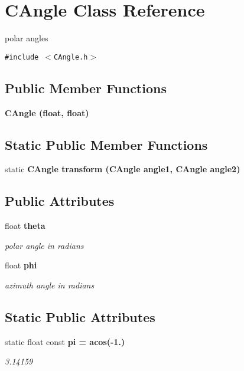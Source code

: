 \section{CAngle Class Reference}
\label{classCAngle}
polar angles  


{\tt \#include $<$CAngle.h$>$}

\subsection*{Public Member Functions}
\begin{CompactItemize}
\item 
\bf{CAngle} (float, float)
\end{CompactItemize}
\subsection*{Static Public Member Functions}
\begin{CompactItemize}
\item 
static \bf{CAngle} \bf{transform} (\bf{CAngle} angle1, \bf{CAngle} angle2)
\end{CompactItemize}
\subsection*{Public Attributes}
\begin{CompactItemize}
\item 
float \bf{theta}\label{classCAngle_4ce1fc08c3bcabeb4742371708f6ce20}

\begin{CompactList}\small\item\em polar angle in radians \item\end{CompactList}\item 
float \bf{phi}\label{classCAngle_849918a2e21598520d01438d04c80527}

\begin{CompactList}\small\item\em azimuth angle in radians \item\end{CompactList}\end{CompactItemize}
\subsection*{Static Public Attributes}
\begin{CompactItemize}
\item 
static float const \bf{pi} = acos(-1.)\label{classCAngle_a78ec96fc7fa58efaed2655d8e3f1e16}

\begin{CompactList}\small\item\em 3.14159 \item\end{CompactList}\end{CompactItemize}


